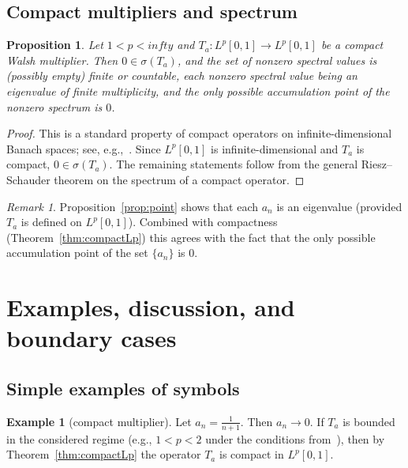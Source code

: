 \documentclass[a4paper,12pt]{article}
\newtheorem{proposition}[theorem]{Proposition}
\theoremstyle{definition}
\theoremstyle{remark}
\newtheorem{remark}[theorem]{Remark}
\theoremstyle{definition}
\newtheorem{example}[theorem]{Example}
\newcommand{\Lp}{L^p[0,1]}
\def\infty{infty}%
\begin{document}
\subsection{Compact multipliers and spectrum}

\begin{proposition}
\label{prop:compactSpectrum}
Let $1<p<\infty$ and $T_a:\Lp\to\Lp$ be a compact Walsh multiplier.
Then $0\in\sigma(T_a)$, and the set of nonzero spectral values is (possibly empty) finite or countable,
each nonzero spectral value being an eigenvalue of finite multiplicity,
and the only possible accumulation point of the nonzero spectrum is $0$. 
\end{proposition}

\begin{proof}
This is a standard property of compact operators on infinite-dimensional Banach spaces;
see, e.g.,~\cite{Conway,DunfordSchwartz}.
Since $\Lp$ is infinite-dimensional and $T_a$ is compact, $0\in\sigma(T_a)$.
The remaining statements follow from the general Riesz–Schauder theorem on the spectrum of a compact operator.
\end{proof}

\begin{remark}
Proposition~\ref{prop:point} shows that each $a_n$ is an eigenvalue (provided $T_a$ is defined on $\Lp$).
Combined with compactness (Theorem~\ref{thm:compactLp}) this agrees with the fact
that the only possible accumulation point of the set $\{a_n\}$ is $0$.
\end{remark}

\section{Examples, discussion, and boundary cases}
\label{sec:examples}

\subsection{Simple examples of symbols}

\begin{example}[compact multiplier]
Let $a_n=\frac{1}{n+1}$.
Then $a_n\to0$.
If $T_a$ is bounded in the considered regime (e.g., $1<p<2$ under the conditions from~\cite{BoundednessWalsh}),
then by Theorem~\ref{thm:compactLp} the operator $T_a$ is compact in $\Lp$.
\end{example}
\end{document}
